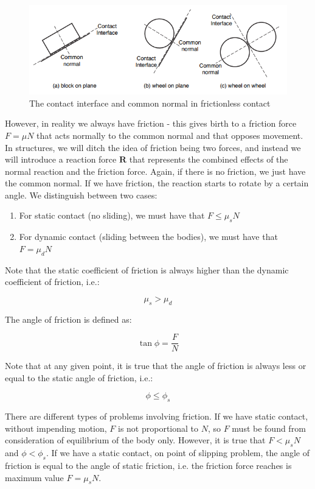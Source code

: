 \documentclass{article}
\begin{document}
\begin{figure}[h]
    \centering
    \includegraphics[width = 1\textwidth]{images/fcontact.png}
    \caption{The contact interface and common normal in frictionless contact}
    \label{fig:frictionless-contact}
\end{figure}

However, in reality we always have friction - this gives birth to a friction force $F = \mu N$ that acts normally to the common normal and that opposes movement. In structures, we will ditch the idea of friction being two forces, and instead we will introduce a reaction force $\mathbf{R}$ that represents the combined effects of the normal reaction and the friction force. Again, if there is no friction, we just have the common normal. If we have friction, the reaction starts to rotate by a certain angle. We distinguish between two cases:

\begin{enumerate}
    \item For static contact (no sliding), we must have that $F \leq \mu_sN$
    \item For dynamic contact (sliding between the bodies), we must have that $F = \mu_dN$
\end{enumerate}

Note that the static coefficient of friction is always higher than the dynamic coefficient of friction, i.e.:

\[ \mu_s > \mu_d \]

\begin{definition}
    The angle of friction is defined as:
    
    \[ \tan{\phi} = \frac{F}{N} \]
\end{definition}

Note that at any given point, it is true that the angle of friction is always less or equal to the static angle of friction, i.e.:

\[ \phi \leq \phi_s \]

There are different types of problems involving friction. If we have static contact, without impending motion, $F$ is not proportional to $N$, so $F$ must be found from consideration of equilibrium of the body only. However, it is true that $F < \mu_sN$ and $\phi < \phi_s$. If we have a static contact, on point of slipping problem, the angle of friction is equal to the angle of static friction, i.e. the friction force reaches is maximum value $F = \mu_sN$.
\end{document}

